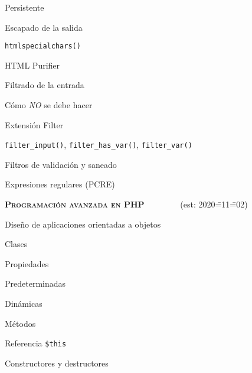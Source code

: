 \begin{longenum}
\begin{longenum}
\begin{longenum}
\begin{longenum}
                \item Persistente
                \item Escapado de la salida
                \begin{longenum}
                    \item \texttt{htmlspecialchars()}
                    \item HTML Purifier
                \end{longenum}
            \end{longenum}
            \item Filtrado de la entrada
            \begin{longenum}
                \item Cómo \textit{NO} se debe hacer
                \item Extensión Filter
                \begin{longenum}
                    \item \texttt{filter\_input()}, \texttt{filter\_has\_var()}, \texttt{filter\_var()}
                    \item Filtros de validación y saneado
                \end{longenum}
                \item Expresiones regulares (PCRE)
            \end{longenum}
        \end{longenum}
    \end{longenum}
    \item \textbf{\textsc{Programación avanzada en PHP}} \ \ \ \ \ \ \ \ (est: 2020\==11\==02)
    \begin{longenum}
        \item Diseño de aplicaciones orientadas a objetos
        \begin{longenum}
            \item Clases
            \item Propiedades
            \begin{longenum}
                \item Predeterminadas
                \item Dinámicas
            \end{longenum}
            \item Métodos
            \begin{longenum}
                \item Referencia \texttt{\$this}
                \item Constructores y destructores

\end{longenum}
\end{longenum}
\end{longenum}
\end{longenum}

